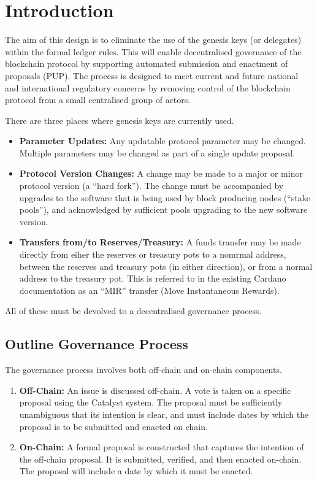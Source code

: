 \section{Introduction}

The aim of this design is to eliminate the use of the genesis keys (or delegates) within the formal ledger rules.  This will enable
decentralised governance of the blockchain protocol by supporting automated submission and enactment of proposals (PUP).
The process is designed to meet current and future national and international regulatory concerns by removing control of the blockchain protocol
from a small centralised group of actors.

There are three places where genesis keys are currently used.


\begin{itemize}
\item
  \textbf{Parameter Updates:}
  Any updatable protocol parameter may be changed.  Multiple parameters may be changed as part of a single update proposal.
\item
  \textbf{Protocol Version Changes:}
  A change may be made to a major or minor protocol version (a ``hard fork'').  The change must be accompanied by upgrades to
  the software that is being used by block producing nodes (``stake pools''), and acknowledged by sufficient pools upgrading to the new software version.
\item
  \textbf{Transfers from/to Reserves/Treasury:}
  A funds transfer may be made directly from eiher the reserves or treasury pots to a nomrmal address, between the reserves and treasury pots (in either direction), or from a normal address to the treasury pot.  This is referred to in the existing Cardano documentation as an ``MIR'' transfer (Move Instantaneous Rewards).
\end{itemize}

All of these must be devolved to a decentralised governance process.

\subsection{Outline Governance Process}

The governance process involves both off-chain and on-chain components.

\begin{enumerate}
\item
  \textbf{Off-Chain:}
  An issue is discussed off-chain.  A vote is taken on a specific proposal using the Catalyst system.  The proposal must be sufficiently unambiguous that its intention is clear, and must include dates by which the proposal is to be submitted and enacted on chain.
\item
  \textbf{On-Chain:}
  A formal proposal is constructed that captures the intention of the off-chain proposal.  It is submitted, verified, and then enacted on-chain.  The proposal will include a date by which it must be enacted.
\end{enumerate}


